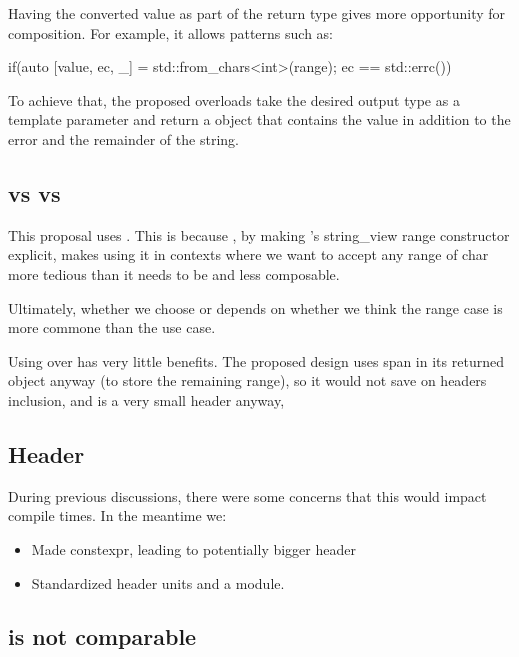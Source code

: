 \documentclass{wg21}
\begin{document}
Having the converted value as part of the return type gives more opportunity for composition.
For example, it allows patterns such as:

\begin{colorblock}
if(auto [value, ec, _]  = std::from_chars<int>(range); ec == std::errc()) {}
\end{colorblock}

To achieve that, the proposed  overloads take the desired output type as a template parameter
and return a  object that contains the value in addition to the error and the remainder of the string.

\subsection{ vs  vs }
This proposal uses .
This is because , by making 's string_view range constructor explicit, makes using it in contexts where we want to accept any range of char more tedious than it needs to be and less composable.

Ultimately, whether we choose  or  depends on whether we think the range case is more commone than the  use case.

Using  over  has very little benefits.
The proposed design uses span in its returned object anyway (to store the remaining range), so it would not save on headers inclusion, and  is a very small header anyway,

\subsection{Header}

During previous discussions, there were some concerns that this would impact compile times.
In the meantime we:

\begin{itemize}
\item Made  constexpr, leading to potentially bigger header
\item Standardized header units and a  module.
\end{itemize}

\subsection{ is not comparable}
\end{document}
